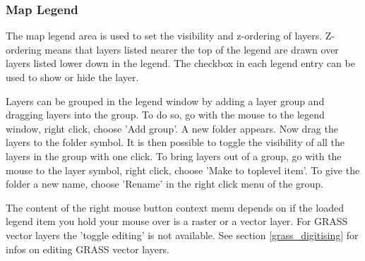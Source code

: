 \subsubsection{Map Legend}\label{label_legend}

The map legend area is used to set the visibility and z-ordering of layers.
Z-ordering means that layers listed nearer the top of the legend are drawn
over layers listed lower down in the legend. The checkbox in each legend
entry can be used to show or hide the layer.

Layers can be grouped in the legend window by adding a layer group and dragging layers 
into the group. To do so, go with the mouse to the legend window, right click, choose 'Add group'. 
A new folder appears. Now drag the layers to the folder symbol. It is then possible to toggle the 
visibility of all the layers in the group with one click. To bring layers out of a group, go with 
the mouse to the layer symbol, right click, choose 'Make to toplevel item'. To give the folder a 
new name, choose 'Rename' in the right click menu of the group.

The content of the right mouse button context menu depends on if the loaded legend item you hold your 
mouse over is a raster or a vector layer. For GRASS vector layers the 'toggle editing' is not 
available. See section \ref{grass_digitising} for infos on editing GRASS vector layers. 

